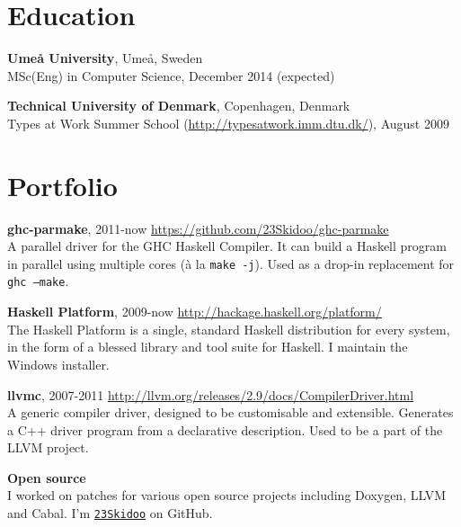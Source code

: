 \documentclass[margin,line]{res}
\begin{document}
\begin{resume}

\section{\sc Education}
{\bf Umeå University}, Umeå, Sweden\\
MSc(Eng) in Computer Science, December 2014 (expected)

{\bf Technical University of Denmark}, Copenhagen, Denmark\\
Types at Work Summer School (\url{http://typesatwork.imm.dtu.dk/}), August 2009

\section{\sc Portfolio}

{\bf ghc-parmake}, 2011-now \hfill \url{https://github.com/23Skidoo/ghc-parmake}\\
A parallel driver for the GHC Haskell Compiler. It can build a Haskell
program in parallel using multiple cores (à la \texttt{make -j}). Used as a
drop-in replacement for \texttt{ghc --make}.

{\bf Haskell Platform}, 2009-now \hfill \url{http://hackage.haskell.org/platform/}\\
The Haskell Platform is a single, standard Haskell distribution for every
system, in the form of a blessed library and tool suite for Haskell. I maintain
the Windows installer.

{\bf llvmc}, 2007-2011 \hfill \url{http://llvm.org/releases/2.9/docs/CompilerDriver.html}\\
A generic compiler driver, designed to be customisable and extensible. Generates
a C++ driver program from a declarative description. Used to be a part of the
LLVM project.


{\bf Open source}\\ I worked on patches for various open source projects
including Doxygen, LLVM and Cabal. I'm
\href{https://github.com/23Skidoo/}{\texttt{23Skidoo}} on GitHub.


\end{resume}
\end{document}

